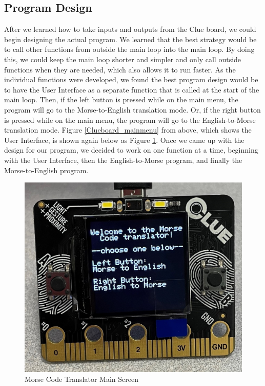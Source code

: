 \documentclass[12pt]{article}
\begin{document}
\FloatBarrier
\subsection{Program Design}
After we learned how to take inputs and outputs from the Clue board, we could begin designing the actual program. We learned that the best strategy would be to call other functions from outside the main loop into the main loop. By doing this, we could keep the main loop shorter and simpler and only call outside functions when they are needed, which also allows it to run faster. As the individual functions were developed, we found the best program design would be to have the User Interface as a separate function that is called at the start of the main loop. Then, if the left button is pressed while on the main menu, the program will go to the Morse-to-English translation mode. Or, if the right button is pressed while on the main menu, the program will go to the English-to-Morse translation mode. Figure \ref{Clueboard_mainmenu} from above, which shows the User Interface, is shown again below as Figure \ref{UserInterface}. Once we came up with the design for our program, we decided to work on one function at a time, beginning with the User Interface, then the English-to-Morse program, and finally the Morse-to-English program.

\begin{figure}[!ht]
\centering
\includegraphics[width=4 in]{images/Main Screen.jpg}
\caption{Morse Code Translator Main Screen}
\label{UserInterface}
\end{figure}
\end{document}
